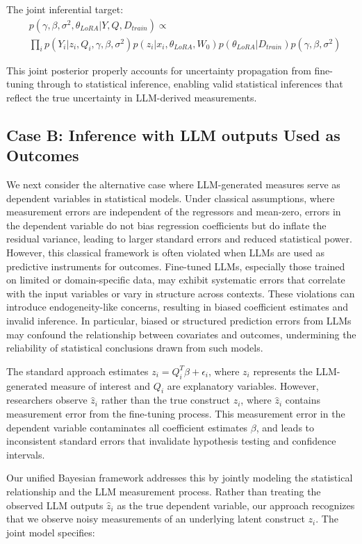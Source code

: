\documentclass[11pt]{article}
\begin{document}
The joint inferential target:
\begin{align}
&p(\gamma, \beta, \sigma^2, \theta_{LoRA}|Y, Q, D_{train}) \propto \label{eq:joint_target} \\
&\prod_i p(Y_i|z_i, Q_i, \gamma, \beta, \sigma^2)p(z_i|x_i, \theta_{LoRA}, W_0)p(\theta_{LoRA}|D_{train})p(\gamma, \beta, \sigma^2) \nonumber
\end{align}

This joint posterior properly accounts for uncertainty propagation from fine-tuning through to statistical inference, enabling valid statistical inferences that reflect the true uncertainty in LLM-derived measurements.

\subsection{Case B: Inference with LLM outputs Used as Outcomes}

We next consider the alternative case where LLM-generated measures serve as dependent variables in statistical models. Under classical assumptions, where measurement errors are independent of the regressors and mean-zero, errors in the dependent variable do not bias regression coefficients but do inflate the residual variance, leading to larger standard errors and reduced statistical power. However, this classical framework is often violated when LLMs are used as predictive instruments for outcomes. Fine-tuned LLMs, especially those trained on limited or domain-specific data, may exhibit systematic errors that correlate with the input variables or vary in structure across contexts. These violations can introduce endogeneity-like concerns, resulting in biased coefficient estimates and invalid inference. In particular, biased or structured prediction errors from LLMs may confound the relationship between covariates and outcomes, undermining the reliability of statistical conclusions drawn from such models.

The standard approach estimates $z_i = Q_i^T\beta + \epsilon_i$, where $z_i$ represents the LLM-generated measure of interest and $Q_i$ are explanatory variables. However, researchers observe $\hat{z}_i$ rather than the true construct $z_i$, where $\hat{z}_i$ contains measurement error from the fine-tuning process. This measurement error in the dependent variable contaminates all coefficient estimates $\beta$, and leads to inconsistent standard errors that invalidate hypothesis testing and confidence intervals.

Our unified Bayesian framework addresses this by jointly modeling the statistical relationship and the LLM measurement process. Rather than treating the observed LLM outputs $\hat{z}_i$ as the true dependent variable, our approach recognizes that we observe noisy measurements of an underlying latent construct $z_i$. The joint model specifies:
\end{document}
